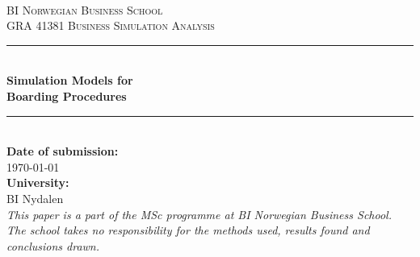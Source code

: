 \begin{titlepage}

\newcommand{\HRule}{\color{rockwoolcolor}\rule{\linewidth}{0.75mm}\color{black}} %

\center %
 
\ \\[1.5cm]
\textsc{\LARGE BI Norwegian Business School}\\[1.5cm] %
\textsc{\Large GRA 41381
Business Simulation Analysis}\\[2.5cm] %



\HRule \\[0.4cm]
{ \huge \bfseries Simulation Models for \\[0.5cm] Boarding Procedures}\\[0.4cm] %
\HRule \\[2.5cm]
 

{\large \textbf{Date of submission:}\\  \today}\\[1cm] %
{\large \textbf{University:}\\  BI Nydalen}\\[3cm] %
 

\textit{This paper is a part of the MSc programme at BI Norwegian Business School. The school takes no
responsibility for the methods used, results found and conclusions drawn.}
\vfill %

\end{titlepage}
